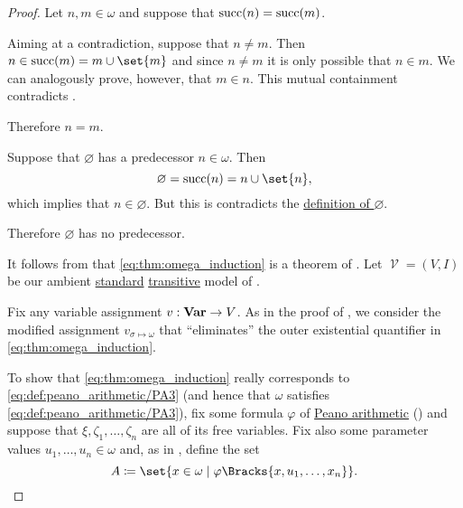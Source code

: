 \begin{proof}
   Let \( n, m \in \omega \) and suppose that \( \operatorname{succ}(n) = \operatorname{succ}(m) \).

  Aiming at a contradiction, suppose that \( n \neq m \). Then \( n \in \op{succ}(m) = m \cup \set{ m } \) and since \( n \neq m \) it is only possible that \( n \in m \). We can analogously prove, however, that \( m \in n \). This mutual containment contradicts .

  Therefore \( n = m \).

   Suppose that \( \varnothing \) has a predecessor \( n \in \omega \). Then
  \begin{equation*}
    \varnothing = \op{succ}(n) = n \cup \set{ n },
  \end{equation*}
  which implies that \( n \in \varnothing \). But this is contradicts the \hyperref[def:empty_set]{definition of \( \varnothing \)}.

  Therefore \( \varnothing \) has no predecessor.

   It follows from  that \eqref{eq:thm:omega_induction} is a theorem of . Let \( \mscrV = (V, I) \) be our ambient \hyperref[rem:standard_model_of_set_theory]{standard} \hyperref[rem:transitive_model_of_set_theory]{transitive} model of .

  Fix any variable assignment \( v: \operatorname{\mathbf{Var}} \to V \). As in the proof of , we consider the modified assignment \( v_{\sigma \mapsto \omega} \) that \enquote{eliminates} the outer existential quantifier in \eqref{eq:thm:omega_induction}.

  To show that \eqref{eq:thm:omega_induction} really corresponds to \eqref{eq:def:peano_arithmetic/PA3} (and hence that \( \omega \) satisfies \eqref{eq:def:peano_arithmetic/PA3}), fix some formula \( \varphi \) of \hyperref[def:peano_arithmetic]{Peano arithmetic} () and suppose that \( \xi, \zeta_1, \ldots, \zeta_n \) are all of its free variables. Fix also some parameter values \( u_1, \ldots, u_n \in \omega \) and, as in , define the set
  \begin{equation*}
    A \coloneqq \set{ x \in \omega \given \varphi\Bracks{x, u_1, \ldots, x_n} }.
  \end{equation*}


\end{proof}
